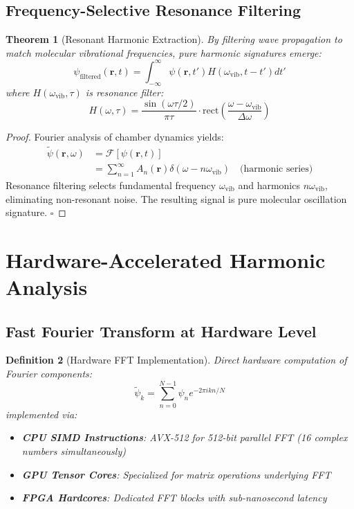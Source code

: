 \documentclass[12pt,a4paper]{article}
\newtheorem{theorem}{Theorem}[section]
\newtheorem{definition}[theorem]{Definition}
\begin{document}
\subsection{Frequency-Selective Resonance Filtering}

\begin{theorem}[Resonant Harmonic Extraction]
By filtering wave propagation to match molecular vibrational frequencies, pure harmonic signatures emerge:
\begin{equation}
\psi_{\text{filtered}}(\mathbf{r}, t) = \int_{-\infty}^{\infty} \psi(\mathbf{r}, t') H(\omega_{\text{vib}}, t-t') dt'
\end{equation}
where $H(\omega_{\text{vib}}, \tau)$ is resonance filter:
\begin{equation}
H(\omega, \tau) = \frac{\sin(\omega \tau/2)}{\pi \tau} \cdot \text{rect}\left(\frac{\omega - \omega_{\text{vib}}}{\Delta \omega}\right)
\end{equation}
\end{theorem}

\begin{proof}
Fourier analysis of chamber dynamics yields:
\begin{align}
\tilde{\psi}(\mathbf{r}, \omega) &= \mathcal{F}[\psi(\mathbf{r}, t)] \\
&= \sum_{n=1}^{\infty} A_n(\mathbf{r}) \delta(\omega - n\omega_{\text{vib}}) \quad \text{(harmonic series)}
\end{align}
Resonance filtering selects fundamental frequency $\omega_{\text{vib}}$ and harmonics $n\omega_{\text{vib}}$, eliminating non-resonant noise. The resulting signal is pure molecular oscillation signature. $\square$
\end{proof}

\section{Hardware-Accelerated Harmonic Analysis}

\subsection{Fast Fourier Transform at Hardware Level}

\begin{definition}[Hardware FFT Implementation]
Direct hardware computation of Fourier components:
\begin{equation}
\tilde{\psi}_k = \sum_{n=0}^{N-1} \psi_n e^{-2\pi i kn/N}
\end{equation}
implemented via:
\begin{itemize}
\item \textbf{CPU SIMD Instructions}: AVX-512 for 512-bit parallel FFT (16 complex numbers simultaneously)
\item \textbf{GPU Tensor Cores}: Specialized for matrix operations underlying FFT
\item \textbf{FPGA Hardcores}: Dedicated FFT blocks with sub-nanosecond latency
\end{itemize}
\end{definition}
\end{document}
